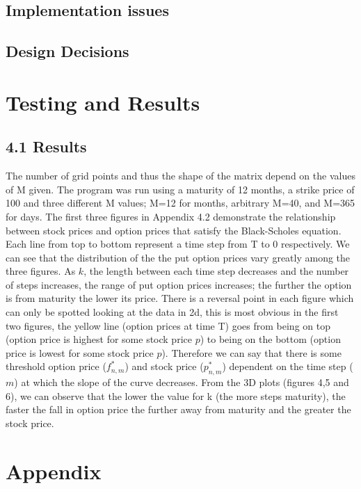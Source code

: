 \documentclass[paper=a4, fontsize=10pt]{article} %
\begin{document}
\subsection{Implementation issues}
\subsection{Design Decisions}

\section{Testing and Results}



\subsection{4.1 Results}

The number of grid points and thus the shape of the matrix depend on the values of M given. The program was run using a maturity of 12 months, a strike price of 100 and three different M values; M=12 for months, arbitrary M=40, and M=365 for days. The first three figures in Appendix 4.2 demonstrate the relationship between stock prices and option prices that satisfy the Black-Scholes equation. Each line from top to bottom represent a time step from T to 0 respectively. We can see that the distribution of the the put option prices vary greatly among the three figures. As $k$, the length between each time step decreases and the number of steps increases, the range of put option prices increases; the further the option is from maturity the lower its price. There is a reversal point in each figure which can only be spotted looking at the data in 2d, this is most obvious in the first two figures, the yellow line (option prices at time T) goes from being on top (option price is highest for some stock price $p$) to being on the bottom (option price is lowest for some stock price $p$). Therefore we can say that there is some threshold option price ($f^{*}_{n,m}$) and stock price ($p^{*}_{n,m}$) dependent on the time step ($m$) at which the slope of the curve decreases. From the 3D plots (figures 4,5 and 6), we can observe that the lower the value for k (the more steps maturity), the faster the fall in option price the further away from maturity and the greater the stock price.

\clearpage
\section*{Appendix}
\end{document}
